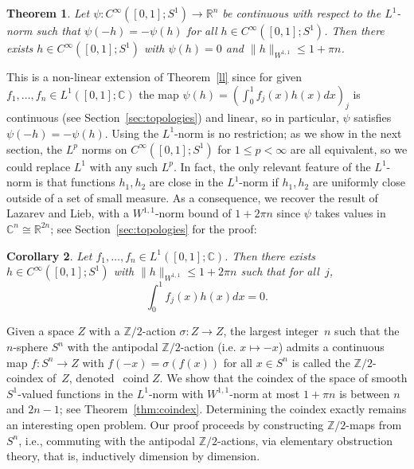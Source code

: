 \documentclass[11pt, reqno, english]{amsart}
\theoremstyle{plain}
\newtheorem{theorem}{Theorem}[section]
\newtheorem{corollary}[theorem]{Corollary}
\theoremstyle{definition}
\newcommand{\R}{\mathbb{R}}
\newcommand{\C}{\mathbb{C}}
\newcommand{\Z}{\mathbb{Z}}
\DeclareMathOperator{\coind}{\mathrm{coind}}
\begin{document}
\begin{theorem}\label{main}
  Let $\psi\colon C^{\infty}([0, 1]; S^{1}) \rightarrow \mathbb{R}^{n}$ 
  be continuous with respect to the $L^{1}$-norm such that $\psi(-h)= - \psi(h)$ for all $h \in C^{\infty}([0, 1]; S^{1})$. 
  Then there exists $h \in C^{\infty}([0, 1]; S^{1})$ with $\psi(h) = 0$ and
  $\|h\|_{W^{1, 1}} \le 1 + \pi n$.
\end{theorem}

This is a non-linear extension of Theorem~\ref{ll} since for given $f_{1}, \ldots , f_{n} \in L^{1}([0, 1]; \C)$ the map $\psi(h) = (\int_{0}^{1}f_{j}(x)h(x)dx)_{j}$ is continuous (see Section~\ref{sec:topologies}) and linear, so in particular, $\psi$ satisfies $\psi(-h) = -\psi(h)$.
Using the $L^{1}$-norm is no restriction; as we show in the next section, the
$L^{p}$ norms on $C^{\infty}([0, 1]; S^{1})$ for $1 \le p < \infty$ are all
equivalent, so we could replace $L^{1}$ with any such $L^{p}$. In fact, the
only relevant feature of the $L^{1}$-norm is that functions $h_{1}, h_{2}$ are
close in the $L^{1}$-norm if $h_{1}, h_{2}$ are uniformly close outside of a
set of small measure. As a consequence, we
recover the result of Lazarev and Lieb, with a $W^{1,1}$-norm bound of $1 + 2 \pi n$ since
$\psi$ takes values in $\C^{n} \cong \R^{2n}$; see Section~\ref{sec:topologies} for the proof:

\begin{corollary}\label{cor:main}
  Let $f_{1}, \ldots , f_{n} \in L^{1}([0, 1]; \C)$. Then there exists $h \in
  C^{\infty}([0, 1]; S^{1})$ with $\|h\|_{W^{1, 1}} \le 1 + 2\pi n$ such that for all~$j$,
  $$\int_{0}^{1}f_{j}(x)h(x)dx = 0.$$
\end{corollary}

Given a space $Z$ with a $\Z/2$-action $\sigma\colon Z \to Z$, the largest integer~$n$ such that the $n$-sphere $S^n$ with the antipodal $\Z/2$-action (i.e. $x \mapsto -x$) admits a continuous map $f\colon S^n \to Z$ with $f(-x) = \sigma(f(x))$ for all $x \in S^n$ is called the $\Z/2$-coindex of~$Z$, denoted~$\coind Z$. We show that the coindex of the space of smooth $S^1$-valued functions in the $L^1$-norm with $W^{1,1}$-norm at most $1 + \pi n$ is between $n$ and $2n-1$; see Theorem~\ref{thm:coindex}. Determining the coindex exactly remains an interesting open problem. Our proof proceeds by constructing $\Z/2$-maps from~$S^n$, i.e., commuting with the antipodal $\Z/2$-actions, via elementary obstruction theory, that is, inductively dimension by dimension. 
\end{document}
